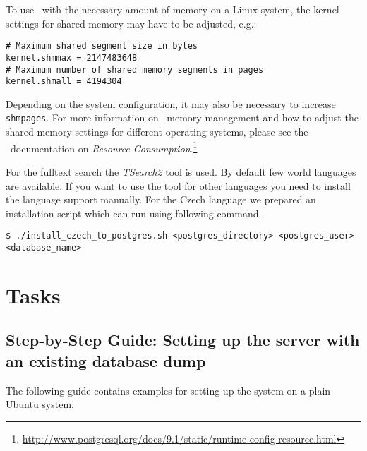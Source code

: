 To use \postgres~with the necessary amount of memory on a Linux system, the kernel settings for shared memory may have to be adjusted, e.g.:

\vspace*{0.5em}
\begin{lstlisting}
# Maximum shared segment size in bytes
kernel.shmmax = 2147483648
# Maximum number of shared memory segments in pages
kernel.shmall = 4194304
\end{lstlisting}
\vspace*{0.5em}

Depending on the system configuration, it may also be necessary to increase {\tt shmpages}. For more information on \postgres~memory management and how to adjust the shared memory settings for different operating systems, please see the \postgres~documentation on \emph{Resource Consumption}.\footnote{\url{http://www.postgresql.org/docs/9.1/static/runtime-config-resource.html}}

For the fulltext search the \emph{TSearch2} tool is used. By default few world languages are available. If you want to use the tool for other languages you need to install the language support manually. For the Czech language we prepared an installation script which can run using following command.

\vspace*{0.5em}
\begin{lstlisting}
$ ./install_czech_to_postgres.sh <postgres_directory> <postgres_user> <database_name>
\end{lstlisting}
\vspace*{0.5em}


\section{Tasks}

\subsection{Step-by-Step Guide: Setting up the server with an existing database dump}

The following guide contains examples for setting up the system on a plain Ubuntu system.

